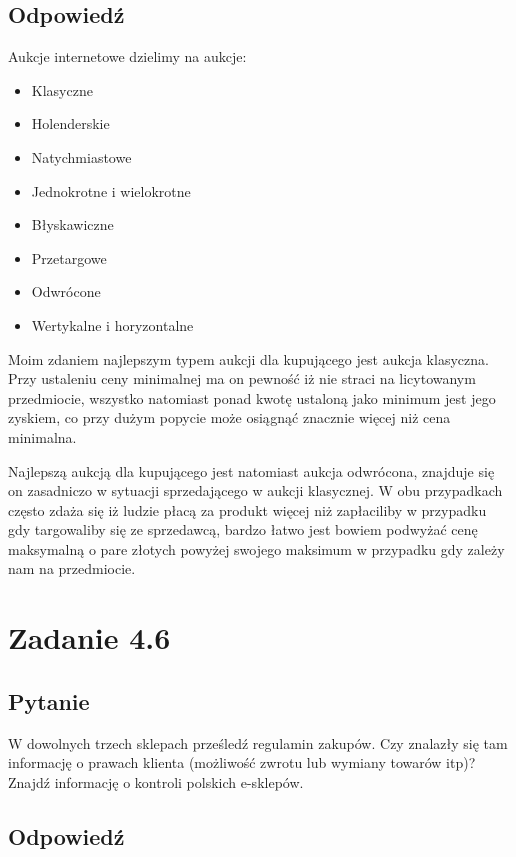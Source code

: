 \documentclass[paper=a4, fontsize=11pt]{scrartcl} %
\numberwithin{equation}{section} %
\numberwithin{figure}{section} %
\numberwithin{table}{section} %
\begin{document}
\subsection {Odpowiedź}

Aukcje internetowe dzielimy na aukcje:
\begin{itemize}
  \item Klasyczne
  \item Holenderskie
  \item Natychmiastowe
  \item Jednokrotne i wielokrotne
  \item Błyskawiczne
  \item Przetargowe
  \item Odwrócone
  \item Wertykalne i horyzontalne
\end{itemize}

Moim zdaniem najlepszym typem aukcji dla kupującego jest aukcja klasyczna. Przy ustaleniu ceny
minimalnej ma on pewność iż nie straci na licytowanym przedmiocie, wszystko natomiast ponad kwotę
ustaloną jako minimum jest jego zyskiem, co przy dużym popycie może osiągnąć znacznie więcej niż
cena minimalna.

Najlepszą aukcją dla kupującego jest natomiast aukcja odwrócona, znajduje się on zasadniczo w sytuacji
sprzedającego w aukcji klasycznej. W obu przypadkach często zdaża się iż ludzie płacą za produkt więcej
niż zapłaciliby w przypadku gdy targowaliby się ze sprzedawcą, bardzo łatwo jest bowiem podwyżać cenę
maksymalną o pare złotych powyżej swojego maksimum  w przypadku gdy zależy nam na przedmiocie.


\section{Zadanie 4.6}

\subsection {Pytanie}

W dowolnych trzech sklepach prześledź regulamin zakupów. Czy znalazły się tam informację o prawach
klienta (możliwość zwrotu lub wymiany towarów itp)? Znajdź informację o kontroli polskich e-sklepów.

\subsection {Odpowiedź}
\end{document}

